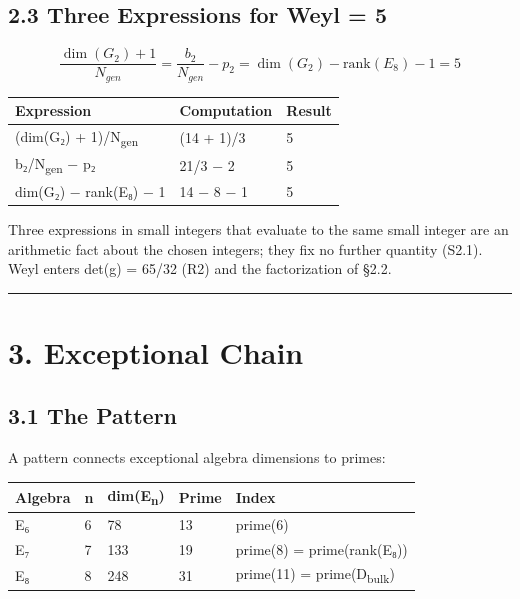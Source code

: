 \documentclass[11pt,a4paper]{article}
\begin{document}
\subsection{2.3 Three Expressions for Weyl = 5}\label{three-expressions-for-weyl-5}

\[\frac{\dim(G_2) + 1}{N_{gen}} = \frac{b_2}{N_{gen}} - p_2 = \dim(G_2) - \text{rank}(E_8) - 1 = 5\]

\begin{longtable}[]{@{}lll@{}}
\toprule\noalign{}
Expression & Computation & Result \\
\midrule\noalign{}
\endhead
\bottomrule\noalign{}
\endlastfoot
(dim(G₂) + 1)/N\textsubscript{gen} & (14 + 1)/3 & 5 \\
b₂/N\textsubscript{gen} − p₂ & 21/3 − 2 & 5 \\
dim(G₂) − rank(E₈) − 1 & 14 − 8 − 1 & 5 \\
\end{longtable}

Three expressions in small integers that evaluate to the same small integer are an arithmetic fact about the chosen integers; they fix no further quantity (S2.1). Weyl enters det(g) = 65/32 (R2) and the factorization of §2.2.

\begin{center}\rule{\linewidth}{0.5pt}\end{center}

\section{3. Exceptional Chain}\label{exceptional-chain}

\subsection{3.1 The Pattern}\label{the-pattern}

A pattern connects exceptional algebra dimensions to primes:

\begin{longtable}[]{@{}lllll@{}}
\toprule\noalign{}
Algebra & n & dim(E\textsubscript{n}) & Prime & Index \\
\midrule\noalign{}
\endhead
\bottomrule\noalign{}
\endlastfoot
E₆ & 6 & 78 & 13 & prime(6) \\
E₇ & 7 & 133 & 19 & prime(8) = prime(rank(E₈)) \\
E₈ & 8 & 248 & 31 & prime(11) = prime(D\textsubscript{bulk}) \\
\end{longtable}
\end{document}
